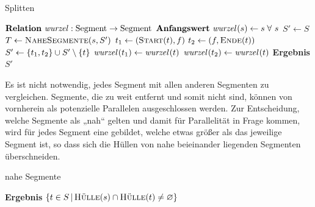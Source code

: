 \documentclass[../main/thesis.tex]{subfiles}
\begin{document}
\begin{algorithmhere}{Splitten}
\label{alg:Splitten}
\begin{algorithmic}
\State $\textbf{Relation}\ \relation{wurzel} : \textrm{Segment} \rightarrow \textrm{Segment}$
\State $\textbf{Anfangswert}\ \relation{wurzel}[s] \eqdefrel s\;\forall\ s$
	\State $S' \gets S$
			\State $T \gets \textproc{NaheSegmente}(s, S')$
				\State $t_1 \gets (\textproc{Start}(t), f)$
				\State $t_2 \gets (f, \textproc{Ende}(t))$
				\State $S' \gets \{t_1, t_2\} \cup S' \setminus \{t\}$
				\State $\relation{wurzel}[t_1] \gets \relation{wurzel}[t]$
				\State $\relation{wurzel}[t_2] \gets \relation{wurzel}[t]$
			\EndFor
		\EndFor
	\EndFor
	\State \textbf{Ergebnis} $S'$
\EndFunction
\end{algorithmic}
\end{algorithmhere}

Es ist nicht notwendig, jedes Segment mit allen anderen Segmenten zu vergleichen.
Segmente, die zu weit entfernt und somit nicht  sind, können von vornherein als potenzielle Parallelen ausgeschlossen werden.
Zur Entscheidung, welche Segmente als „nah“ gelten und damit für Parallelität in Frage kommen, wird für jedes Segment eine  gebildet, welche etwas größer als das jeweilige Segment ist, so dass sich die Hüllen von nahe beieinander liegenden Segmenten überschneiden.

\begin{algorithmhere}{nahe Segmente}
\label{alg:NaheSegmente}
\begin{algorithmic}
	\State \textbf{Ergebnis} $\Set{t \in S \SetCond \textproc{Hülle}(s) \cap \textproc{Hülle}(t) \neq \Nil}$
\EndFunction
\end{algorithmic}
\end{algorithmhere}

\end{document}
